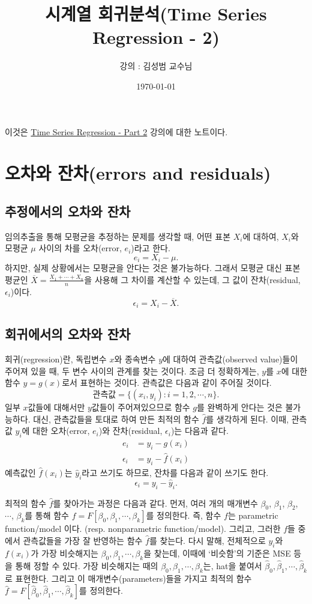 \documentclass{article}
\begin{document}
\title{시계열 회귀분석(Time Series Regression - 2)}
\author{강의 : 김성범 교수님}
\date{\today}
\maketitle

이것은 \href{https://youtu.be/pxG4ZlHJ570}{Time Series Regression - Part 2} 강의에 대한 노트이다.
\tableofcontents

\newpage

\section{오차와 잔차(errors and residuals)}
\subsection{추정에서의 오차와 잔차}
임의추출을 통해 모평균을 추정하는 문제를 생각할 때, 어떤 표본 \(X_i\)에 대하여, \(X_i\)와 모평균 \(\mu\) 사이의 차를 오차(error, \(e_i\))라고 한다.
\[e_i = X_i-\mu.\]
하지만, 실제 상황에서는 모평균을 안다는 것은 불가능하다.
그래서 모평균 대신 표본평균인 \(\overline X = \frac{X_1+\cdots+X_n}n\)을 사용해 그 차이를 계산할 수 있는데, 그 값이 잔차(residual, \(\epsilon_i\))이다.
\[\epsilon_i = X_i-\overline X.\]
\subsection{회귀에서의 오차와 잔차}
회귀(regression)란, 독립변수 \(x\)와 종속변수 \(y\)에 대하여 관측값(observed value)들이 주어져 있을 때, 두 변수 사이의 관계를 찾는 것이다.
조금 더 정확하게는, \(y\)를 \(x\)에 대한 함수 \(y=g(x)\)로서 표현하는 것이다.
관측값은 다음과 같이 주어질 것이다.
\[\text{관측값} = \{(x_i,y_i):i=1,2,\cdots,n\}.\]
일부 \(x\)값들에 대해서만 \(y\)값들이 주어져있으므로 함수 \(g\)를 완벽하게 안다는 것은 불가능하다.
대신, 관측값들을 토대로 하여 만든 최적의 함수 \(\hat f\)를 생각하게 된다.
이때, 관측값 \(y_i\)에 대한 오차(error, \(e_i\))와 잔차(residual, \(\epsilon_i\))는 다음과 같다.
\begin{align}
e_i&=y_i-g(x_i)\label{error}\\
\epsilon_i&=y_i-\hat f(x_i)\label{residual}
\end{align}
예측값인 \(\hat f(x_i)\)는 \(\hat y_i\)라고 쓰기도 하므로, 잔차를 다음과 같이 쓰기도 한다.
\[\epsilon_i=y_i-\hat y_i.\]

최적의 함수 \(\hat f\)를 찾아가는 과정은 다음과 같다.
먼저, 여러 개의 매개변수 \(\beta_0\), \(\beta_1\), \(\beta_2\), \(\cdots\), \(\beta_k\)를 통해 함수 \(f=F[\beta_0,\beta_1,\cdots,\beta_k]\)를 정의한다.
즉, 함수 \(f\)는 parametric function/model 이다. (resp. nonparametric function/model).
그리고, 그러한 \(f\)들 중에서 관측값들을 가장 잘 반영하는 함수 \(\hat f\)를 찾는다.
다시 말해, 전체적으로 \(y_i\)와 \(f(x_i)\)가 가장 비슷해지는 \(\beta_0,\beta_1,\cdots,\beta_k\)을 찾는데, 이때에 `비슷함'의 기준은 MSE 등을 통해 정할 수 있다.
가장 비슷해지는 때의 \(\beta_0,\beta_1,\cdots,\beta_k\)는, hat을 붙여서 \(\hat\beta_0,\hat\beta_1,\cdots,\hat\beta_k\)로 표현한다.
그리고 이 매개변수(parameters)들을 가지고 최적의 함수 \(\hat f =  F[\hat\beta_0,\hat\beta_1,\cdots,\hat\beta_k]\)를 정의한다.
\end{document}
